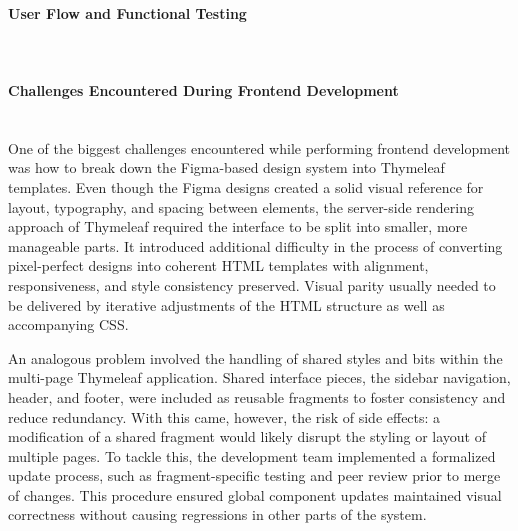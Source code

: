 \paragraph{User Flow and Functional Testing}\mbox{}\\

\paragraph{Challenges Encountered During Frontend Development}\mbox{}\\

One of the biggest challenges encountered while performing frontend development was how to break down the Figma-based design system into Thymeleaf templates. Even though the Figma designs created a solid visual reference for layout, typography, and spacing between elements, the server-side rendering approach of Thymeleaf required the interface to be split into smaller, more manageable parts. It introduced additional difficulty in the process of converting pixel-perfect designs into coherent HTML templates with alignment, responsiveness, and style consistency preserved. Visual parity usually needed to be delivered by iterative adjustments of the HTML structure as well as accompanying CSS.

An analogous problem involved the handling of shared styles and bits within the multi-page Thymeleaf application. Shared interface pieces, the sidebar navigation, header, and footer, were included as reusable fragments to foster consistency and reduce redundancy. With this came, however, the risk of side effects: a modification of a shared fragment would likely disrupt the styling or layout of multiple pages. To tackle this, the development team implemented a formalized update process, such as fragment-specific testing and peer review prior to merge of changes. This procedure ensured global component updates maintained visual correctness without causing regressions in other parts of the system.
